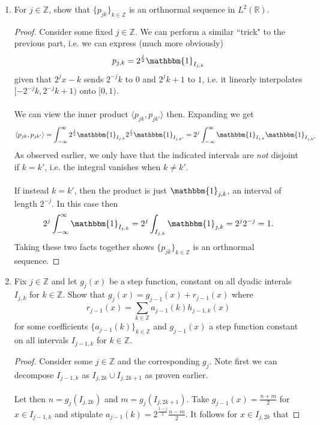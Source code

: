 \documentclass[12pt]{article}
\newenvironment{ex}[2][Exercise]{\begin{trivlist}
\item[\hskip \labelsep {\bfseries #1}\hskip \labelsep {\bfseries #2.}]}{\end{trivlist}}
\begin{document}
\begin{ex}{14}
\begin{enumerate}[label=(\alph*)]
\begin{proof}
        \end{proof}
        \item For $j \in \mathbb{Z}$, show that $\{p_{jk}\}_{k \in \mathbb{Z}}$ is an orthnormal sequence in $L^2(\mathbb{R})$. 
        \begin{proof}
            Consider some fixed $j \in \mathbb{Z}$. We can perform a similar ``trick" to the previous part, i.e. we can express (much more obviously)
            $$p_{j,k} = 2^{\frac{j}{2}}\mathbbm{1}_{I_{j,k}}$$
            given that $2^jx - k$ sends $2^{-j}k$ to $0$ and $2^{j}k + 1$ to $1$, i.e. it linearly interpolates $[-2^{-j}k, 2^{-j}k + 1)$ onto $[0,1)$. \\ \\
            We can view the inner product $\langle p_{jk}, p_{jk'} \rangle$ then. Expanding we get 
            $$\langle p_{jk}, p_{jk'} \rangle = \int_{-\infty}^\infty 2^{\frac{j}{2}}\mathbbm{1}_{I_{j,k}}2^{\frac{j}{2}}\mathbbm{1}_{I_{j,k'}} = 2^j\int_{-\infty}^\infty \mathbbm{1}_{I_{j,k}}\mathbbm{1}_{I_{j,k'}}$$
            As observed earlier, we only have that the indicated intervals are \textit{not} disjoint if $k = k'$, i.e. the integral vanishes when $k \neq k'$.  \\ \\
            If instead $k = k'$, then the product is just $\mathbbm{1}_{j,k}$, an interval of length $2^{-j}$. In this case then 
            $$2^j\int_{-\infty}^\infty \mathbbm{1}_{I_{j,k}} = 2^j\int_{I_{j,k}} \mathbbm{1}_{j,k} = 2^j2^{-j} = 1.$$
            Taking these two facts together shows $\{p_{jk}\}_{k \in \mathbb{Z}}$ is an orthnormal sequence.
        \end{proof}
        \item Fix $j \in \mathbb{Z}$ and let $g_j(x)$ be a step function, constant on all dyadic interals $I_{j,k}$ for $k \in \mathbb{Z}$. Show that $g_j(x) = g_{j - 1}(x) + r_{j - 1}(x)$ where 
        $$r_{j - 1}(x) = \sum_{k \in \mathbb{Z}} a_{j - 1}(k)h_{j - 1, k}(x)$$
        for some coefficients $\{a_{j - 1}(k)\}_{k \in \mathbb{Z}}$ and $g_{j - 1}(x)$ a step function constant on all intervals $I_{j - 1, k}$ for $k \in \mathbb{Z}$.
        \begin{proof}
            Consider some $j \in \mathbb{Z}$ and the corresponding $g_j$. Note first we can decompose $I_{j - 1, k}$ as $I_{j, 2k} \cup I_{j, 2k + 1}$ as proven earlier. \\ \\
            Let then $n = g_j(I_{j, 2k})$ and $m = g_j(I_{j, 2k + 1})$. Take $g_{j - 1}(x) = \frac{n + m}{2}$ for $x \in I_{j - 1,k}$ and stipulate $a_{j - 1}(k) = 2^{\frac{1 - j}{2}}\frac{n - m}{2}$. It follows for $x \in I_{j,2k}$ that

\end{proof}
\end{enumerate}
\end{ex}
\end{document}
